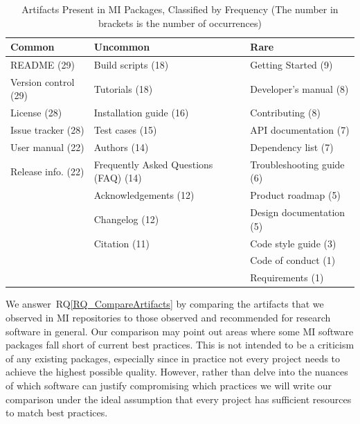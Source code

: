 \documentclass[11pt]{article}
\newcommand{\rqref}[1]{RQ\ref{#1}}
\begin{document}
\begin{table}[ht!]
    \begin{center}
    \begin{tabular}{ p{4.6 cm} p{5.6 cm} p{5 cm}}
    \toprule
    Common & Uncommon & Rare \\
    \midrule
    README (29) & Build scripts (18) & Getting Started (9)\\
    Version control (29) & Tutorials (18) & Developer's manual (8)\\
    License (28) & Installation guide (16) & Contributing (8)\\
    Issue tracker (28) & Test cases (15) & API documentation (7)\\
    User manual (22) & Authors (14) & Dependency list (7)\\
    Release info. (22) & Frequently Asked Questions (FAQ) (14) & Troubleshooting guide (6)\\
     & Acknowledgements (12) & Product roadmap (5)\\
     & Changelog (12) & Design documentation (5)\\
     & Citation (11) & Code style guide (3)\\
     & & Code of conduct (1)\\
     & & Requirements (1)\\
    \bottomrule
    \end{tabular}
    \caption{Artifacts Present in MI Packages, Classified by Frequency (The number 
    in brackets is the number of occurrences)}
    \label{artifactspresent}
    \end{center}
\end{table}

We answer~\rqref{RQ_CompareArtifacts} by comparing the artifacts that we
observed in MI repositories to those observed and recommended for research
software in general. Our comparison may point out areas where some MI software
packages fall short of current best practices. This is not intended to be a
criticism of any existing packages, especially since in practice not every
project needs to achieve the highest possible quality. However, rather than
delve into the nuances of which software can justify compromising which
practices we will write our comparison under the ideal assumption that every
project has sufficient resources to match best practices.
    
\end{document}
